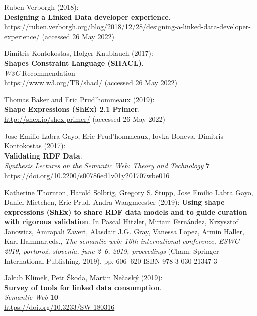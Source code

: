 \begin{thebibliography}{9}
Ruben Verborgh (2018): \\
\textbf{Designing a {Linked Data} developer experience}.\\
\url{https://ruben.verborgh.org/blog/2018/12/28/designing-a-linked-data-developer-experience/}
(accessed 26 May 2022)

Dimitris Kontokostas, Holger Knublauch (2017):\\
\textbf{Shapes {Constraint Language} ({SHACL})}.\\
\emph{W3C} Recommendation\\
\url{https://www.w3.org/TR/shacl/} (accessed 26 May 2022)

Thomas Baker and Eric Prud'hommeaux (2019): \\
\textbf{Shape {Expressions} ({ShEx}) 2.1 {Primer}}. \\
\url{http://shex.io/shex-primer/} (accessed 26 May 2022)

Jose Emilio Labra Gayo, Eric Prud'hommeaux, Iovka Boneva, Dimitris
Kontokostas (2017): \\
\textbf{Validating {RDF Data}}. \\
\emph{Synthesis Lectures on the Semantic Web: Theory and Technology} \textbf{7} \\
\url{https://doi.org/10.2200/s00786ed1v01y201707wbe016}

Katherine Thornton, Harold Solbrig, Gregory S. Stupp, Jose Emilio Labra
Gayo, Daniel Mietchen, Eric Prud, Andra Waagmeester (2019):
\textbf{Using shape expressions ({ShEx}) to share {RDF} data models and
to guide curation with rigorous validation}. In Pascal Hitzler, Miriam
Fernández, Krzysztof Janowicz, Amrapali Zaveri, Alasdair J.G. Gray,
Vanessa Lopez, Armin Haller, Karl Hammar,eds., \emph{The semantic
web: 16th international conference, {ESWC} 2019, portorož, slovenia,
june 2--6, 2019, proceedings} ({Cham}: {Springer International
Publishing}, 2019), pp. 606--620 ISBN 978-3-030-21347-3

Jakub Klímek, Petr Škoda, Martin Nečaský (2019): \\
\textbf{Survey of tools for linked data consumption}. \\
\emph{Semantic Web} \textbf{10} \\
\url{https://doi.org/10.3233/SW-180316}


\end{thebibliography}

